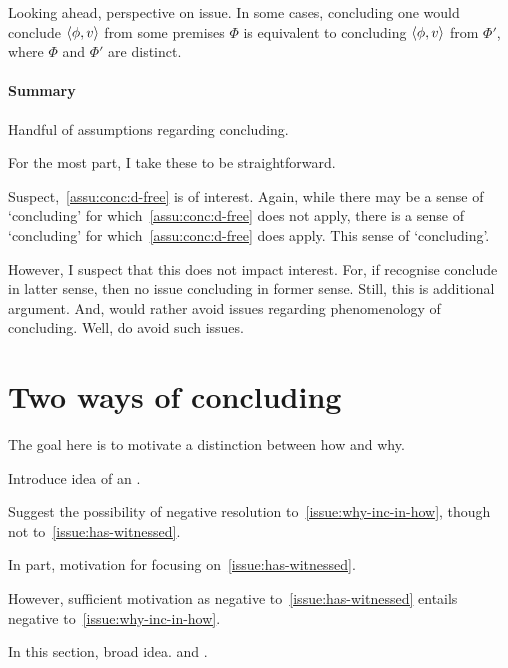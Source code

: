 \begin{note}
  Looking ahead, perspective on issue.
  In some cases, concluding one would conclude \(\langle \phi, v \rangle\) from some premises \(\Phi\) is equivalent to concluding \(\langle \phi, v \rangle\) from \(\Phi'\), where \(\Phi\) and \(\Phi'\) are distinct.
\end{note}

\paragraph*{Summary}

\begin{note}[Summary]
  Handful of assumptions regarding concluding.

  For the most part, I take these to be straightforward.

  Suspect,~\autoref{assu:conc:d-free} is of interest.
  Again, while there may be a sense of `concluding' for which~\autoref{assu:conc:d-free} does not apply, there is a sense of `concluding' for which~\autoref{assu:conc:d-free} does apply.
  This sense of `concluding'.

  However, I suspect that this does not impact interest.
  For, if recognise conclude in latter sense, then no issue concluding in former sense.
  Still, this is additional argument.
  And, would rather avoid issues regarding phenomenology of concluding.
  Well, do avoid such issues.
\end{note}

\section{Two ways of concluding}
\label{sec:overview:two-types-reasoning}

\begin{note}[Goal]
  The goal here is to motivate a distinction between how and why.

  Introduce idea of an \itp{}.

  Suggest the possibility of negative resolution to~\autoref{issue:why-inc-in-how}, though not to~\autoref{issue:has-witnessed}.

  In part, motivation for focusing on~\autoref{issue:has-witnessed}.

  However, sufficient motivation as negative to~\autoref{issue:has-witnessed} entails negative to~\autoref{issue:why-inc-in-how}.
\end{note}

\begin{note}
  In this section, broad idea.
  \adA{} and \adB{}.
\end{note}

